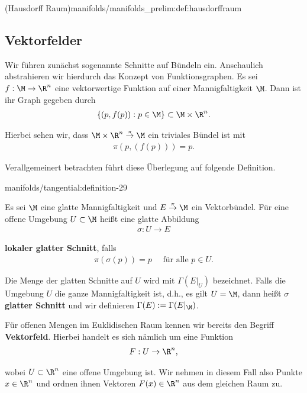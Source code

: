 \documentclass[letterpaper,10pt,english]{jupyterBook}
\begin{document}
\begin{definition}{(Hausdorff Raum)}{manifolds/manifolds_prelim:def:hausdorffraum}
\subsection{Vektorfelder}
\label{\detokenize{manifolds/tangential:vektorfelder}}
\par
Wir führen zunächst sogenannte Schnitte auf Bündeln ein.
Anschaulich abstrahieren wir hierdurch das Konzept von Funktionsgraphen.
Es sei \(f:\M\to\R^n\) eine vektorwertige Funktion auf einer Mannigfaltigkeit \(\M\).
Dann ist ihr Graph gegeben durch
\begin{align*}
\{(p,f(p)): p\in\M\}\subset \M\times\R^n.
\end{align*}
\par
Hierbei sehen wir, dass \(\M\times\R^n\overset{\pi}{\to}\M\) ein triviales Bündel ist mit
\begin{align*}
\pi(p,(f(p))) = p.
\end{align*}
\par
Verallgemeinert betrachten führt diese Überlegung auf folgende Definition.
\begin{definition}{}{manifolds/tangential:definition-29}



\par
Es sei \(\M\) eine glatte Mannigfaltigkeit und \(E\overset{\pi}{\to}\M\) ein Vektorbündel.
Für eine offene Umgebung \(U\subset\M\) heißt eine glatte Abbildung
\begin{align*}
\sigma: U\to E
\end{align*}
\par
\textbf{lokaler glatter Schnitt}, falls
\begin{align*}
\pi(\sigma(p)) = p\quad\text{ für alle }p\in U.
\end{align*}
\par
Die Menge der glatten Schnitte auf \(U\) wird mit \(\Gamma(E\rvert_U)\) bezeichnet.
Falls die Umgebung \(U\) die ganze Mannigfaltigkeit ist, d.h., es gilt \(U=\M\), dann heißt \(\sigma\) \textbf{glatter Schnitt} und wir definieren \(\Gamma(E):=\Gamma(E\rvert_\M)\).
\end{definition}

\par
Für offenen Mengen im Euklidischen Raum kennen wir bereits den Begriff \textbf{Vektorfeld}.
Hierbei handelt es sich nämlich um eine Funktion
\begin{align*}
F:U\to\R^n,
\end{align*}
\par
wobei \(U\subset\R^n\) eine offene Umgebung ist.
Wir nehmen in diesem Fall also Punkte \(x\in\R^n\) und ordnen ihnen Vektoren \(F(x)\in\R^n\) aus dem gleichen Raum zu.


\end{definition}
\end{document}
